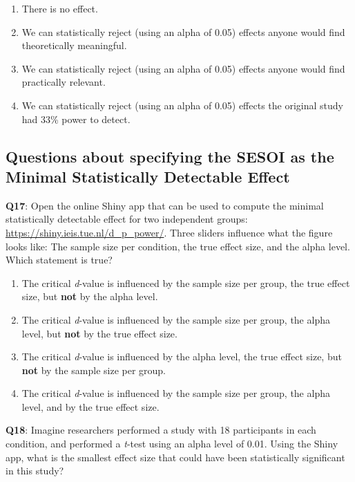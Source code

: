 \documentclass[
  oneside]{book}
\providecommand{\tightlist}{%
  \setlength{\itemsep}{0pt}\setlength{\parskip}{0pt}}
\begin{document}
\begin{enumerate}
\def\labelenumi{\Alph{enumi})}
\tightlist
\item
  There is no effect.
\item
  We can statistically reject (using an alpha of 0.05) effects anyone would find theoretically meaningful.
\item
  We can statistically reject (using an alpha of 0.05) effects anyone would find practically relevant.
\item
  We can statistically reject (using an alpha of 0.05) effects the original study had 33\% power to detect.
\end{enumerate}

\hypertarget{questions-about-specifying-the-sesoi-as-the-minimal-statistically-detectable-effect}{%
\subsection{Questions about specifying the SESOI as the Minimal Statistically Detectable Effect}\label{questions-about-specifying-the-sesoi-as-the-minimal-statistically-detectable-effect}}

\textbf{Q17}: Open the online Shiny app that can be used to compute the minimal statistically detectable effect for two independent groups: \url{https://shiny.ieis.tue.nl/d_p_power/}. Three sliders influence what the figure looks like: The sample size per condition, the true effect size, and the alpha level. Which statement is true?

\begin{enumerate}
\def\labelenumi{\Alph{enumi})}
\tightlist
\item
  The critical \emph{d}-value is influenced by the sample size per group, the true effect size, but \textbf{not} by the alpha level.
\item
  The critical \emph{d}-value is influenced by the sample size per group, the alpha level, but \textbf{not} by the true effect size.
\item
  The critical \emph{d}-value is influenced by the alpha level, the true effect size, but \textbf{not} by the sample size per group.
\item
  The critical \emph{d}-value is influenced by the sample size per group, the alpha level, and by the true effect size.
\end{enumerate}

\textbf{Q18}: Imagine researchers performed a study with 18 participants in each condition, and performed a \emph{t}-test using an alpha level of 0.01. Using the Shiny app, what is the smallest effect size that could have been statistically significant in this study?
\end{document}
